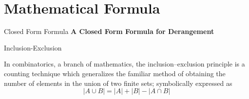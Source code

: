 \documentclass[9pt]{beamer}
\begin{document}
\section{Mathematical Formula}

\begin{frame}{Closed Form Formula}
    \centering
    \LARGE  \textbf{ A Closed Form Formula for Derangement }
\end{frame}


\begin{frame}{Inclusion-Exclusion}
    \begin{theo}
    In combinatorics, a branch of mathematics, the inclusion–exclusion principle is a counting technique which generalizes the familiar method of obtaining the number of elements in the union of two finite sets; symbolically expressed as
    \[|A\cup B| = |A|+|B|-|A \cap B|\]
    \end{theo}
    \centering
    \vspace{1cm}
\end{frame}
\end{document}
